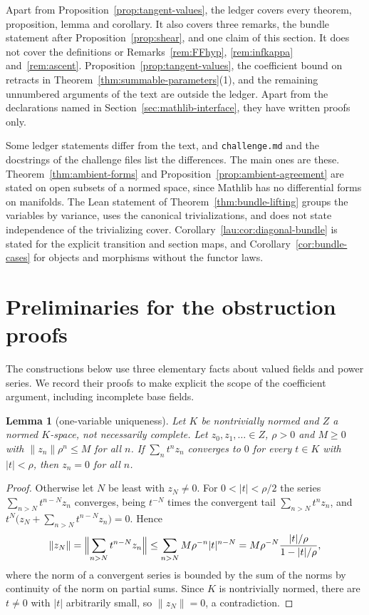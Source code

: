 \documentclass[11pt]{amsart}
\newtheorem{lemma}[theorem]{Lemma}
\theoremstyle{definition}
\theoremstyle{remark}
\numberwithin{equation}{section}
\newcommand{\abs}[1]{\lvert #1\rvert}
\newcommand{\norm}[1]{\lVert #1\rVert}
\begin{document}
Apart from Proposition~\ref{prop:tangent-values}, the ledger covers every theorem, proposition, lemma and corollary. It also covers three remarks,
the bundle statement after Proposition~\ref{prop:shear}, and one claim of this section. It does not cover the definitions or
Remarks~\ref{rem:FFhyp}, \ref{rem:infkappa} and~\ref{rem:ascent}. Proposition~\ref{prop:tangent-values}, the coefficient bound on retracts in Theorem~\ref{thm:summable-parameters}(1), and the remaining unnumbered arguments of the text are outside the ledger. Apart from the declarations named in Section~\ref{sec:mathlib-interface}, they have written proofs only.

Some ledger statements differ from the text, and \texttt{challenge.md} and the docstrings of the challenge files list the differences. The main
ones are these. Theorem~\ref{thm:ambient-forms} and Proposition~\ref{prop:ambient-agreement} are stated
on open subsets of a normed space, since Mathlib has no differential forms on manifolds. The Lean
statement of Theorem~\ref{thm:bundle-lifting} groups the variables by variance, uses the canonical trivializations, and
does not state independence of the trivializing cover. Corollary~\ref{lau:cor:diagonal-bundle} is
stated for the explicit transition and section maps, and Corollary~\ref{cor:bundle-cases} for objects
and morphisms without the functor laws.

\appendix

\section{Preliminaries for the obstruction proofs}\label{app:obstruction-preliminaries}
The constructions below use three elementary facts about valued fields and power series. We record their proofs to make explicit the scope of the coefficient argument, including incomplete base fields.

\begin{lemma}[one-variable uniqueness]\label{lem:unique}
Let $K$ be nontrivially normed and $Z$ a normed $K$\nobreakdash-space, not necessarily complete. Let $z_0,z_1,\ldots\in Z$, $\rho>0$
and $M\ge0$ with $\norm{z_n}\rho^n\le M$ for all $n$. If $\sum_nt^nz_n$ converges to $0$ for every $t\in K$ with
$\abs t<\rho$, then $z_n=0$ for all $n$.
\end{lemma}

\begin{proof}
Otherwise let $N$ be least with $z_N\neq0$. For $0<\abs t<\rho/2$ the series $\sum_{n>N}t^{n-N}z_n$ converges, being
$t^{-N}$ times the convergent tail $\sum_{n>N}t^nz_n$, and $t^N\bigl(z_N+\sum_{n>N}t^{n-N}z_n\bigr)=0$. Hence
\[
\norm{z_N}=\Bigl\lVert\sum_{n>N}t^{n-N}z_n\Bigr\rVert\le\sum_{n>N}M\rho^{-n}\abs t^{n-N}
=M\rho^{-N}\frac{\abs t/\rho}{1-\abs t/\rho},
\]
where the norm of a convergent series is bounded by the sum of the norms by continuity of the norm on partial sums.
Since $K$ is nontrivially normed, there are $t\ne0$ with $\abs t$ arbitrarily small, so $\norm{z_N}=0$, a
contradiction.
\end{proof}
\end{document}
